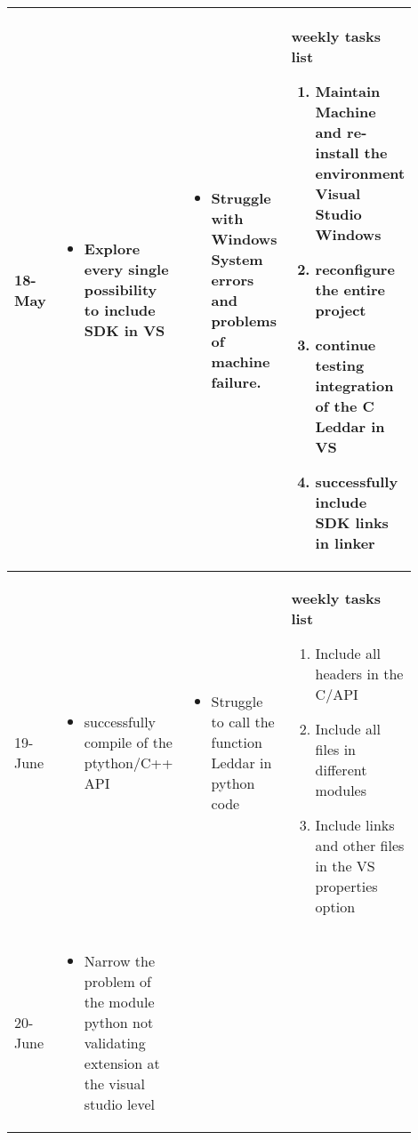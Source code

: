 \begin{longtable}{|l|p{0.3\linewidth}|p{0.3\linewidth}|p{0.3\linewidth}|}
			\\\hline
			
					18-May	&
\begin{itemize}
\item  Explore every single possibility to include SDK in VS   
\end{itemize}
			&
\begin{itemize}
\item Struggle with Windows System errors and problems of machine failure.   
\end{itemize}			
			
			&
			\textbf{ weekly tasks list}
	\begin{enumerate}
	\item  Maintain Machine and re-install the environment Visual Studio Windows
	\item reconfigure the entire project
	\item  continue testing integration of the C Leddar in VS
	\item successfully include SDK links in linker
	\end{enumerate}

			\\\hline
			
					19-June	&
\begin{itemize}
\item successfully compile of the ptython/C++ API 
 
\end{itemize}
			&
\begin{itemize}
\item Struggle to call the function Leddar in python code  
\end{itemize}			
			
			&
			\textbf{ weekly tasks list}
	\begin{enumerate}
	\item  Include all headers in the C/API 
	\item Include all files in different modules  
	\item Include links and other files in the VS properties option
	\
	\end{enumerate}

			\\\hline
			
					20-June	&
\begin{itemize}
\item  Narrow the problem of the module python not validating extension at the visual studio level
 

\end{itemize}
\end{longtable}
